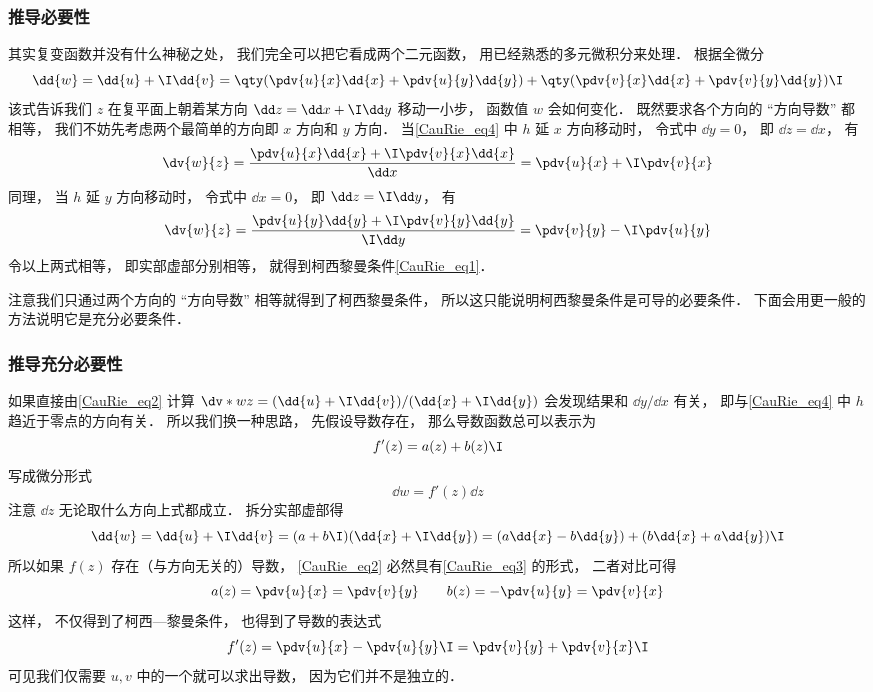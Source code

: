 \subsubsection{推导必要性}
其实复变函数并没有什么神秘之处， 我们完全可以把它看成两个二元函数， 用已经熟悉的多元微积分来处理． 根据全微分
\begin{equation}\label{CauRie_eq2}
\dd{w} = \dd{u} + \I \dd{v} = \qty(\pdv{u}{x} \dd{x} + \pdv{u}{y} \dd{y}) + \qty(\pdv{v}{x} \dd{x} + \pdv{v}{y} \dd{y})\I
\end{equation}
该式告诉我们 $z$ 在复平面上朝着某方向 $\dd z = \dd x + \I \dd y$ 移动一小步， 函数值 $w$ 会如何变化． 既然要求各个方向的 “方向导数” 都相等， 我们不妨先考虑两个最简单的方向即 $x$ 方向和 $y$ 方向． 当\autoref{CauRie_eq4} 中 $h$ 延 $x$ 方向移动时， 令式中 $\dd y = 0$， 即 $\dd z = \dd x$， 有
\begin{equation}
\dv{w}{z} = \frac{\pdv{u}{x} \dd{x} +  \I\pdv{v}{x} \dd{x}}{\dd x} = \pdv{u}{x} +  \I\pdv{v}{x}
\end{equation}
同理， 当 $h$ 延 $y$ 方向移动时， 令式中 $\dd x = 0$， 即 $\dd z = \I\dd y$， 有
\begin{equation}
\dv{w}{z} = \frac{\pdv{u}{y} \dd{y} + \I\pdv{v}{y} \dd{y}}{\I \dd y} = \pdv{v}{y} -\I \pdv{u}{y}
\end{equation}
令以上两式相等， 即实部虚部分别相等， 就得到柯西黎曼条件\autoref{CauRie_eq1}．

注意我们只通过两个方向的 “方向导数” 相等就得到了柯西黎曼条件， 所以这只能说明柯西黎曼条件是可导的必要条件． 下面会用更一般的方法说明它是充分必要条件．

\subsubsection{推导充分必要性}
如果直接由\autoref{CauRie_eq2} 计算 $\dv*{w}{z} = (\dd{u} + \I \dd{v})/(\dd{x} + \I \dd{y})$ 会发现结果和 $\dd{y}/\dd{x}$ 有关， 即与\autoref{CauRie_eq4} 中 $h$ 趋近于零点的方向有关． 所以我们换一种思路， 先假设导数存在， 那么导数函数总可以表示为
\begin{equation}
f'(z) = a(z) + b(z)\I
\end{equation}
写成微分形式
\begin{equation}
\dd{w} = f'(z)\dd{z}
\end{equation}
注意 $\dd z$ 无论取什么方向上式都成立． 拆分实部虚部得
\begin{equation}\label{CauRie_eq3}
\dd{w} = \dd{u} + \I \dd{v} = (a + b\I)(\dd{x} + \I\dd{y}) = (a \dd{x} - b\dd{y}) + (b \dd{x} + a\dd{y})\I
\end{equation}
所以如果 $f(z)$ 存在（与方向无关的）导数， \autoref{CauRie_eq2} 必然具有\autoref{CauRie_eq3} 的形式， 二者对比可得
\begin{equation}
a(z) = \pdv{u}{x} = \pdv{v}{y} \qquad
b(z) = -\pdv{u}{y} = \pdv{v}{x}
\end{equation}
这样， 不仅得到了柯西—黎曼条件， 也得到了导数的表达式
\begin{equation}
f'(z) = \pdv{u}{x} -\pdv{u}{y} \I = \pdv{v}{y} + \pdv{v}{x}\I
\end{equation}
可见我们仅需要 $u, v$ 中的一个就可以求出导数， 因为它们并不是独立的．

